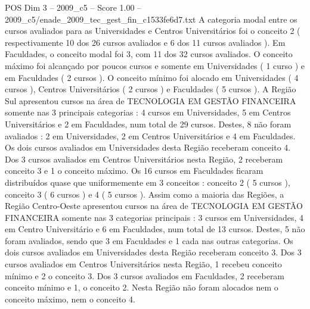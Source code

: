 \begin{textsample}{POS Dim 3 – 2009\_c5 – Score 1.00 – 2009\_c5/enade\_2009\_tec\_gest\_fin\_c1533fe6d7.txt}
A categoria modal entre os cursos avaliados para as Universidades e Centros Universitários foi o conceito 2 ( respectivamente 10 dos 26 cursos avaliados e 6 dos 11 cursos avaliados ).
Em Faculdades, o conceito modal foi 3, com 11 dos 32 cursos avaliados.
O conceito máximo foi alcançado por poucos cursos e somente em Universidades ( 1 curso ) e em Faculdades ( 2 cursos ).
O conceito mínimo foi alocado em Universidades ( 4 cursos ), Centros Universitários ( 2 cursos ) e Faculdades ( 5 cursos ).
A Região Sul apresentou cursos na área de TECNOLOGIA EM GESTÃO FINANCEIRA somente nas 3 principais categorias : 4 cursos em Universidades, 5 em Centros Universitários e 2 em Faculdades, num total de 29 cursos.
Destes, 8 não foram avaliados : 2 em Universidades, 2 em Centros Universitários e 4 em Faculdades.
Os dois cursos avaliados em Universidades desta Região receberam conceito 4.
Dos 3 cursos avaliados em Centros Universitários nesta Região, 2 receberam conceito 3 e 1 o conceito máximo.
Os 16 cursos em Faculdades ficaram distribuídos quase que uniformemente em 3 conceitos : conceito 2 ( 5 cursos ), conceito 3 ( 6 cursos ) e 4 ( 5 cursos ).
Assim como a maioria das Regiões, a Região Centro-Oeste apresentou cursos na área de TECNOLOGIA EM GESTÃO FINANCEIRA somente nas 3 categorias principais : 3 cursos em Universidades, 4 em Centro Universitário e 6 em Faculdades, num total de 13 cursos.
Destes, 5 não foram avaliados, sendo que 3 em Faculdades e 1 cada nas outras categorias.
Os dois cursos avaliados em Universidades desta Região receberam conceito 3.
Dos 3 cursos avaliados em Centros Universitários nesta Região, 1 recebeu conceito mínimo e 2 o conceito 3.
Dos 3 cursos avaliados em Faculdades, 2 receberam conceito mínimo e 1, o conceito 2.
Nesta Região não foram alocados nem o conceito máximo, nem o conceito 4.

\end{textsample}
